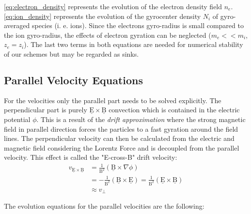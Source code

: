 \documentclass[master.tex]{subfiles}
\begin{document}
\autoref{eq:electron_density} represents the evolution of the electron density field $n_e$.
\autoref{eq:ion_density} represents the evolution of the gyrocenter density $N_i$ of gyro-averaged species (i. e. ions). Since the electrons gyro-radius is small compared to the ion gyro-radius, the effects of electron gyration can be neglected ($m_e << m_i$, $z_e = z_i$). \newline
The last two terms in both equations are needed for numerical stability of our schemes but may be regarded as sinks.


\subsection{Parallel Velocity Equations}
For the velocities only the parallel part needs to be solved explicitly. The perpendicular part is purely $\underline{\mathrm{E}}\times \underline{\mathrm{B}}$ convection which is contained in the electric potential $\phi$. This is a result of the \textit{drift approximation} where the strong magnetic field in parallel direction forces the particles to a fast gyration around the field lines. The perpendicular velocity can then be calculated from the electric and magnetic field considering the Lorentz Force and is decoupled from the parallel velocity. This effect is called the "E-cross-B" drift velocity:
\begin{align}
    v_{\mathrm{\underline{E}}\times\underline{\mathrm{B}}} &= \frac{1}{\mathrm{B}^2} (\underline{\mathrm{B}} \times \nabla \phi) \\
    &= - \frac{1}{\mathrm{B}^2} (\underline{\mathrm{B}} \times \underline{\mathrm{E}}) = \frac{1}{\mathrm{B}^2} (\underline{\mathrm{E}} \times \underline{\mathrm{B}}) \\
    &\approx v_\perp
\end{align}

The evolution equations for the parallel velocities are the following:
\end{document}
